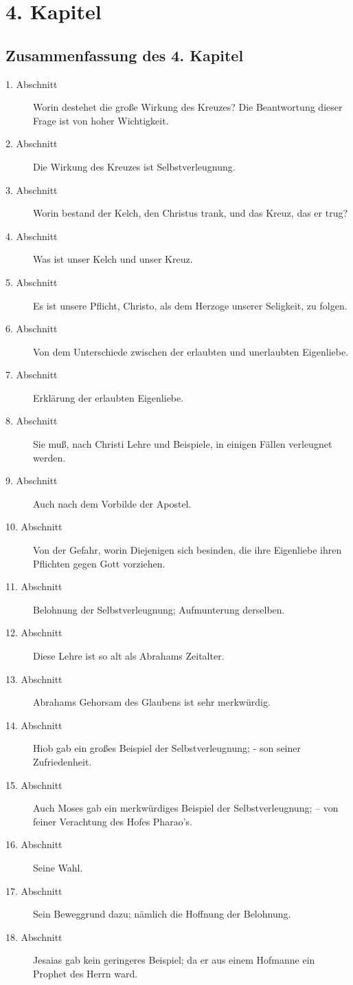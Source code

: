 
\chapter{4. Kapitel}
\section{Zusammenfassung des 4. Kapitel}
\footnotesize
\begin{description}
\item[1. Abschnitt] Worin destehet die große Wirkung des Kreuzes? Die Beantwortung dieser Frage ist von hoher Wichtigkeit.
\item[2. Abschnitt] Die Wirkung des Kreuzes ist Selbstverleugnung.
\item[3. Abschnitt] Worin bestand der Kelch, den Christus trank, und das Kreuz, das er trug?
\item[4. Abschnitt]  Was ist unser Kelch und unser Kreuz.
\item[5. Abschnitt] Es ist unsere Pflicht, Christo, als dem Herzoge unserer Seligkeit, zu folgen.
\item[6. Abschnitt] Von dem Unterschiede zwischen der erlaubten und unerlaubten Eigenliebe.
\item[7. Abschnitt] Erklärung der erlaubten Eigenliebe.
\item[8. Abschnitt] Sie muß, nach Christi Lehre und Beispiele, in einigen Fällen verleugnet werden.
\item[9. Abschnitt] Auch nach dem Vorbilde der Apostel.
\item[10. Abschnitt] Von der Gefahr, worin Diejenigen sich besinden, die ihre Eigenliebe ihren Pflichten gegen Gott vorziehen.
\item[11. Abschnitt] Belohnung der Selbstverleugnung; Aufmunterung derselben.
\item[12. Abschnitt] Diese Lehre ist so alt als Abrahams Zeitalter.
\item[13. Abschnitt] Abrahams Gehorsam des Glaubens ist sehr merkwürdig.
\item[14. Abschnitt] Hiob gab ein großes Beispiel der Selbstverleugnung; - son seiner Zufriedenheit.
\item[15. Abschnitt] Auch Moses gab ein merkwürdiges Beispiel der Selbstverleugnung; -- von feiner Verachtung des Hofes Pharao's.
\item[16. Abschnitt] Seine Wahl.
\item[17. Abschnitt] Sein Beweggrund dazu; nämlich die Hoffnung der Belohnung.
\item[18. Abschnitt] Jesaias gab kein geringeres Beispiel; da er aus einem Hofmanne ein Prophet des Herrn ward.

\end{description}
